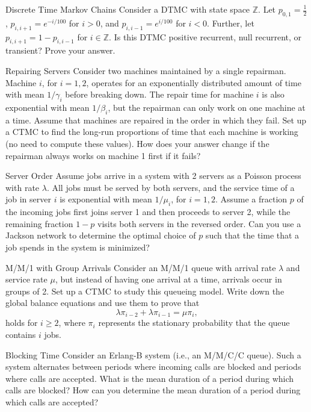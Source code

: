 \begin{problem}{Discrete Time Markov Chains}
Consider a DTMC with state space \( \mathbb{Z} \). Let \( p_{0,1} = \frac{1}{2} \), \( p_{i,i+1} = e^{-i/100} \) for \( i > 0 \), and \( p_{i,i-1} = e^{i/100} \) for \( i < 0 \). Further, let \( p_{i,i+1} = 1 - p_{i,i-1} \) for \( i \in \mathbb{Z} \). Is this DTMC positive recurrent, null recurrent, or transient? Prove your answer.
\end{problem}

\begin{problem}{Repairing Servers}
Consider two machines maintained by a single repairman. Machine \( i \), for \( i = 1, 2 \), operates for an exponentially distributed amount of time with mean \( 1/\gamma_i \) before breaking down. The repair time for machine \( i \) is also exponential with mean \( 1/\beta_i \), but the repairman can only work on one machine at a time. Assume that machines are repaired in the order in which they fail. Set up a CTMC to find the long-run proportions of time that each machine is working (no need to compute these values). How does your answer change if the repairman always works on machine 1 first if it fails?
\end{problem}

\begin{problem}{Server Order}
Assume jobs arrive in a system with 2 servers as a Poisson process with rate \( \lambda \). All jobs must be served by both servers, and the service time of a job in server \( i \) is exponential with mean \( 1/\mu_i \), for \( i = 1, 2 \). Assume a fraction \( p \) of the incoming jobs first joins server 1 and then proceeds to server 2, while the remaining fraction \( 1 - p \) visits both servers in the reversed order. Can you use a Jackson network to determine the optimal choice of \( p \) such that the time that a job spends in the system is minimized?
\end{problem}

\begin{problem}{M/M/1 with Group Arrivals}
Consider an M/M/1 queue with arrival rate \( \lambda \) and service rate \( \mu \), but instead of having one arrival at a time, arrivals occur in groups of 2. Set up a CTMC to study this queueing model. Write down the global balance equations and use them to prove that
   \[
   \lambda \pi_{i-2} + \lambda \pi_{i-1} = \mu \pi_i,
   \]
   holds for \( i \geq 2 \), where \( \pi_i \) represents the stationary probability that the queue contains \( i \) jobs.
\end{problem}

\begin{problem}{Blocking Time}
Consider an Erlang-B system (i.e., an M/M/C/C queue). Such a system alternates between periods where incoming calls are blocked and periods where calls are accepted. What is the mean duration of a period during which calls are blocked? How can you determine the mean duration of a period during which calls are accepted?
\end{problem}
